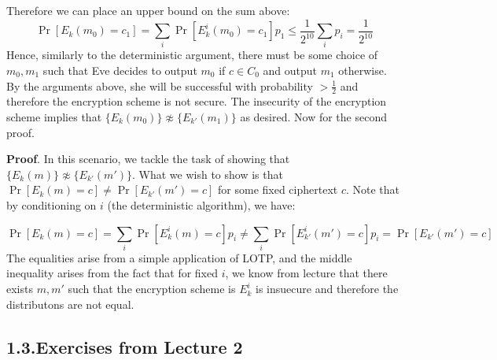\documentclass{article}
\begin{document}
\begin{enumerate}[noitemsep,topsep=\mdcompacttopsep,start=4]
Therefore we can place an upper bound on the sum above:
\noindent\noindent\[%
\Pr[E_k(m_0) = c_1] = \sum_i \Pr[E^i_k(m_0) = c_1] p_1 \leq \frac{1}{2^10} \sum_i p_i = \frac{1}{2^10}
\]%
Hence, similarly to the deterministic argument, there must be some choice of $m_0,m_1$ such that Eve
decides to output $m_0$ if $c \in C_0$ and output $m_1$ otherwise. By the arguments above, she will be 
successful with probability $> \frac{1}{2}$ and therefore the encryption scheme is not secure.
The insecurity of the encryption scheme implies that $\{ E_k(m_0) \} \not\approx \{E_{k'}(m_1) \}$ as desired.
\mdfloatright{\ensuremath{\Box}}
Now for the second proof.

\begin{mdbmarginx}{1ex}{0pt}{1ex}{0pt}%
\noindent{}\textbf{Proof}.  In this scenario, we tackle the task of showing that $\{E_k(m) \} \not\approx \{E_{k'}(m')\}$. What we wish to
show is that $\Pr[E_k(m) = c] \neq \Pr[E_{k'}(m') = c]$ for some fixed ciphertext $c$. Note that by 
conditioning on $i$ (the deterministic algorithm), we have:%
\end{mdbmarginx}%
\noindent\noindent\[%
\Pr[E_k(m) = c] = \sum_i \Pr[E^i_k(m) = c] p_i \neq \sum_{i} \Pr[E^i_{k'}(m') = c] p_i = \Pr[E_{k'}(m') = c]
\]%
The equalities arise from a simple application of LOTP, and the middle inequality arises from the fact that
for fixed $i$, we know from lecture that there exists $m,m'$ such that the encryption scheme is 
$E^i_k$ is insuecure and therefore the distributons are not equal. 
\mdfloatright{\ensuremath{\Box}}%
\end{enumerate}%

\subsection{1.3.\hspace*{0.5em}Exercises from Lecture 2}\label{sec-exercises-from-lecture-2}%
\end{document}
